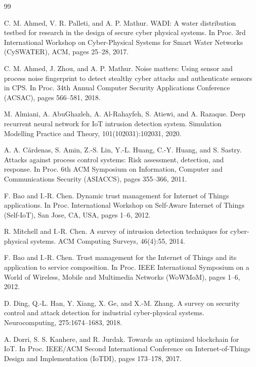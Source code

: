 \begin{thebibliography}{99}
\small
\setlength{\itemsep}{3pt}

 C. M. Ahmed, V. R. Palleti, and A. P. Mathur. WADI: A water distribution testbed for research in the design of secure cyber physical systems. In Proc. 3rd International Workshop on Cyber-Physical Systems for Smart Water Networks (CySWATER), ACM, pages 25--28, 2017.

 C. M. Ahmed, J. Zhou, and A. P. Mathur. Noise matters: Using sensor and process noise fingerprint to detect stealthy cyber attacks and authenticate sensors in CPS. In Proc. 34th Annual Computer Security Applications Conference (ACSAC), pages 566--581, 2018.

 M. Almiani, A. AbuGhazleh, A. Al-Rahayfeh, S. Atiewi, and A. Razaque. Deep recurrent neural network for IoT intrusion detection system. Simulation Modelling Practice and Theory, 101(102031):102031, 2020.

 A. A. C\'ardenas, S. Amin, Z.-S. Lin, Y.-L. Huang, C.-Y. Huang, and S. Sastry. Attacks against process control systems: Risk assessment, detection, and response. In Proc. 6th ACM Symposium on Information, Computer and Communications Security (ASIACCS), pages 355--366, 2011.

 F. Bao and I.-R. Chen. Dynamic trust management for Internet of Things applications. In Proc. International Workshop on Self-Aware Internet of Things (Self-IoT), San Jose, CA, USA, pages 1--6, 2012.

 R. Mitchell and I.-R. Chen. A survey of intrusion detection techniques for cyber-physical systems. ACM Computing Surveys, 46(4):55, 2014.

 F. Bao and I.-R. Chen. Trust management for the Internet of Things and its application to service composition. In Proc. IEEE International Symposium on a World of Wireless, Mobile and Multimedia Networks (WoWMoM), pages 1--6, 2012.

 D. Ding, Q.-L. Han, Y. Xiang, X. Ge, and X.-M. Zhang. A survey on security control and attack detection for industrial cyber-physical systems. Neurocomputing, 275:1674--1683, 2018.

 A. Dorri, S. S. Kanhere, and R. Jurdak. Towards an optimized blockchain for IoT. In Proc. IEEE/ACM Second International Conference on Internet-of-Things Design and Implementation (IoTDI), pages 173--178, 2017.


\end{thebibliography}
